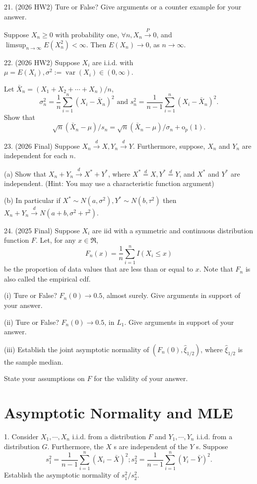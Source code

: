 \documentclass[11pt]{article}
\theoremstyle{definition}
\begin{document}
21. (2026 HW2) Ture or False? Give arguments or a counter example for your answer.

Suppose $X_n \geq 0$ with probability one, $\forall n, X_n \xrightarrow{P} 0$, and $\limsup _{n \rightarrow \infty} E\left(X_n^2\right)<\infty$. Then $E\left(X_n\right) \rightarrow 0$, as $n \rightarrow \infty$.

22. (2026 HW2) Suppose $X_i$ are i.i.d. with $\mu=E\left(X_i\right), \sigma^2:=\operatorname{var}\left(X_i\right) \in(0, \infty)$.

Let $\bar{X}_n=\left(X_1+X_2+\cdots+X_n\right) / n$,
$$
\sigma_n^2=\frac{1}{n} \sum_{i=1}^n\left(X_i-\bar{X}_n\right)^2 \text { and } s_n^2=\frac{1}{n-1} \sum_{i=1}^n\left(X_i-\bar{X}_n\right)^2 .
$$
Show that
$$
\sqrt{n}\left(\bar{X}_n-\mu\right) / s_n=\sqrt{n}\left(\bar{X}_n-\mu\right) / \sigma_n+\mathrm{o}_p(1) .
$$

23. (2026 Final) Suppose $X_n \xrightarrow{d} X, Y_n \xrightarrow{d} Y$. Furthermore, suppose, $X_n$ and $Y_n$ are independent for each $n$.

(a) Show that $X_n+Y_n \xrightarrow{d} X^*+Y^*$, where $X^* \stackrel{d}{=} X, Y^* \stackrel{d}{=} Y$, and $X^*$ and $Y^*$ are independent. (Hint: You may use a characteristic function argument)

(b) In particular if $X^* \sim N\left(a, \sigma^2\right), Y^* \sim N\left(b, \tau^2\right)$ then $X_n+Y_n \xrightarrow{d} N\left(a+b, \sigma^2+\tau^2\right)$.

24. (2025 Final) Suppose $X_i$ are iid with a symmetric and continuous distribution function $F$. Let, for any $x \in \Re$,
$$
F_n(x)=\frac{1}{n} \sum_{i=1}^n I\left(X_i \leq x\right)
$$
be the proportion of data values that are less than or equal to $x$. Note that $F_n$ is also called the empirical cdf.

(i) Ture or False? $F_n(0) \rightarrow 0.5$, almost surely. Give arguments in support of your answer.

(ii) Ture or False? $F_n(0) \rightarrow 0.5$, in $L_1$. Give arguments in support of your answer.

(iii) Establish the joint asymptotic normality of $\left(F_n(0), \widehat{\xi}_{1 / 2}\right)$, where $\widehat{\xi}_{1 / 2}$ is the sample median.

State your assumptions on $F$ for the validity of your answer.

\newpage

\section{Asymptotic Normality and MLE}
1. Consider $X_1, \cdots, X_n$ i.i.d. from a distribution $F$ and $Y_1, \cdots, Y_n$ i.i.d. from a distribution $G$. Furthermore, the $X$ s are independent of the $Y$ s. Suppose
$$
s_1^2=\frac{1}{n-1} \sum_{i=1}^n\left(X_i-\bar{X}\right)^2 ; s_2^2=\frac{1}{n-1} \sum_{i=1}^n\left(Y_i-\bar{Y}\right)^2 .
$$
Establish the asymptotic normality of $s_1^2 / s_2^2$.
\end{document}
